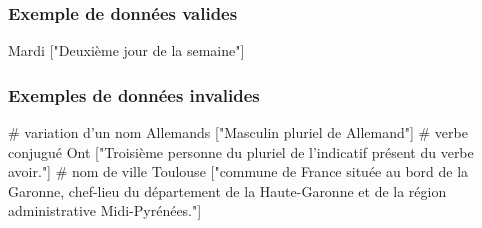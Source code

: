\documentclass[french]{template}
\begin{document}
\subsubsection{Exemple de données valides}

\begin{pythoncode}
    Mardi ["Deuxième jour de la semaine"]
\end{pythoncode}

\subsubsection{Exemples de données invalides}

\begin{pythoncode}
    # variation d'un nom
    Allemands ["Masculin pluriel de Allemand"]
    # verbe conjugué
    Ont ["Troisième personne du pluriel de l'indicatif présent du verbe avoir."]
    # nom de ville
    Toulouse ["commune de France située au bord de la Garonne,  chef-lieu du département de la Haute-Garonne et de la région administrative Midi-Pyrénées."]
\end{pythoncode}
\end{document}
